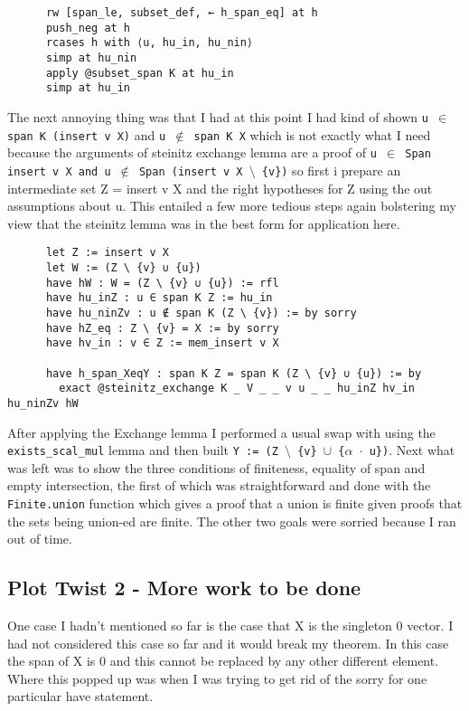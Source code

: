 \documentclass{article}
\begin{document}
\begin{lstlisting}
      rw [span_le, subset_def, ← h_span_eq] at h
      push_neg at h
      rcases h with ⟨u, hu_in, hu_nin⟩
      simp at hu_nin
      apply @subset_span K at hu_in
      simp at hu_in
\end{lstlisting}

The next annoying thing was that I had at this point I had kind of shown \texttt{u $\in$ span K (insert v X)} and  \texttt{u $\notin$ span K X} which is not exactly what I need because the arguments of steinitz exchange lemma are a proof of \texttt{u $\in$ Span insert v X and u $\notin$ Span (insert v X $\setminus$ \{v\})} so first i prepare an intermediate set Z = insert v X and the right hypotheses for Z using the out assumptions about u. This entailed a few more tedious steps again bolstering my view that the steinitz lemma was in the best form for application here.

\begin{lstlisting}
      let Z := insert v X
      let W := (Z \ {v} ∪ {u})
      have hW : W = (Z \ {v} ∪ {u}) := rfl
      have hu_inZ : u ∈ span K Z := hu_in
      have hu_ninZv : u ∉ span K (Z \ {v}) := by sorry
      have hZ_eq : Z \ {v} = X := by sorry
      have hv_in : v ∈ Z := mem_insert v X
    
      have h_span_XeqY : span K Z = span K (Z \ {v} ∪ {u}) := by
        exact @steinitz_exchange K _ V _ _ v u _ _ hu_inZ hv_in hu_ninZv hW
\end{lstlisting}

After applying the Exchange lemma I performed a usual swap with using the \texttt{exists\_scal\_mul} lemma and then built \texttt{Y := (Z $\setminus$ \{v\} $\cup$ \{$\alpha$ $\cdot$ u\})}. Next what was left was to show the three conditions of finiteness, equality of span and empty intersection, the first of which was straightforward and done with the \texttt{Finite.union} function which gives a proof that a union is finite given proofs that the sets being union-ed are finite. The other two goals were sorried because I ran out of time.

\subsection{Plot Twist 2 - More work to be done}

One case I hadn't mentioned so far is the case that X is the singleton 0 vector. I had not considered this case so far and it would break my theorem. In this case the span of X is 0 and this cannot be replaced by any other different element. Where this popped up was when I was trying to get rid of the sorry for one particular have statement.
\end{document}
